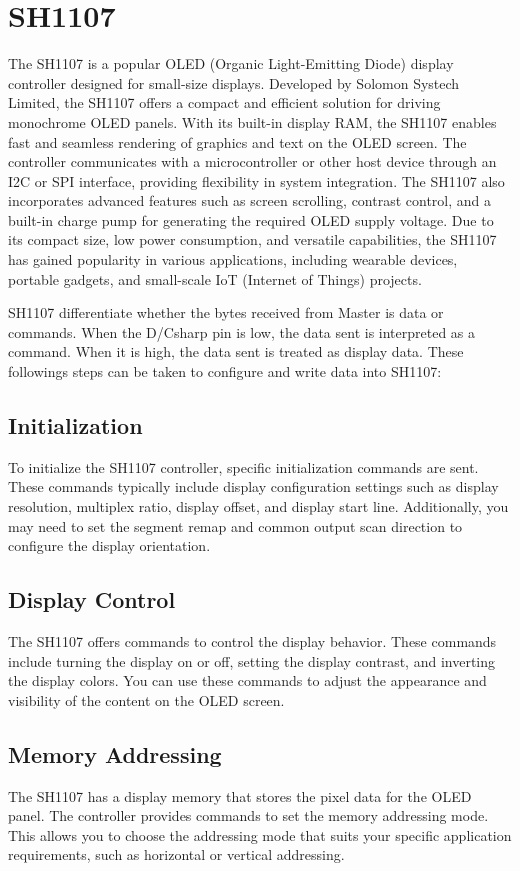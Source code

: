 \section{SH1107}
The SH1107 is a popular OLED (Organic Light-Emitting Diode) display controller designed for small-size displays. 
Developed by Solomon Systech Limited, the SH1107 offers a compact and efficient solution for driving monochrome OLED panels. 
With its built-in display RAM, the SH1107 enables fast and seamless rendering of graphics and text on the OLED screen. 
The controller communicates with a microcontroller or other host device through an I2C or SPI interface, providing flexibility in system integration. 
The SH1107 also incorporates advanced features such as screen scrolling, contrast control, and a built-in charge pump for generating the required OLED supply voltage. 
Due to its compact size, low power consumption, and versatile capabilities, the SH1107 has gained popularity in various applications, including wearable devices, portable gadgets, and small-scale IoT (Internet of Things) projects. \cite{SH1107_datasheet}

SH1107 differentiate whether the bytes received from Master is data or commands. When the D/Csharp pin is low, the data sent is interpreted as a command. When it is high, the data sent is treated as display data. These followings steps can be taken to configure and write data into SH1107:

\subsection{Initialization}
To initialize the SH1107 controller, specific initialization commands are sent. These commands typically include display configuration settings such as display resolution, multiplex ratio, display offset, and display start line. Additionally, you may need to set the segment remap and common output scan direction to configure the display orientation.

\subsection{Display Control}
The SH1107 offers commands to control the display behavior. These commands include turning the display on or off, setting the display contrast, and inverting the display colors. You can use these commands to adjust the appearance and visibility of the content on the OLED screen.

\subsection{Memory Addressing}
The SH1107 has a display memory that stores the pixel data for the OLED panel. The controller provides commands to set the memory addressing mode. This allows you to choose the addressing mode that suits your specific application requirements, such as horizontal or vertical addressing.

